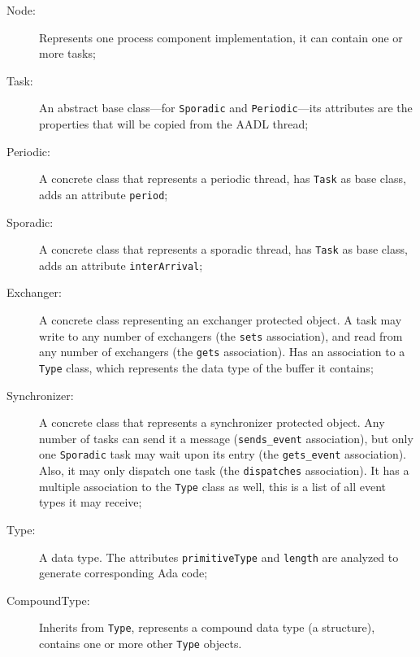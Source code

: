 \begin{description}
\item[Node:]{Represents one process component implementation, it can
  contain one or more tasks;}
\item[Task:]{An abstract base class---for \texttt{Sporadic} and
  \texttt{Periodic}---its attributes are the properties that will be
  copied from the AADL thread;}
\item[Periodic:]{A concrete class that represents a periodic thread,
  has \texttt{Task} as base class, adds an attribute \texttt{period};}
\item[Sporadic:]{A concrete class that represents a sporadic thread,
  has \texttt{Task} as base class, adds an attribute
  \texttt{interArrival};}
\item[Exchanger:]{A concrete class representing an exchanger protected
  object. A task may write to any number of exchangers (the
  \texttt{sets} association), and read from any number of exchangers
  (the \texttt{gets} association). Has an association to a
  \texttt{Type} class, which represents the data type of the buffer it
  contains;}
\item[Synchronizer:]{A concrete class that represents a synchronizer
  protected object. Any number of tasks can send it a message
  (\texttt{sends\_event} association), but only one \texttt{Sporadic}
  task may wait upon its entry (the \texttt{gets\_event}
  association). Also, it may only dispatch one task (the
  \texttt{dispatches} association). It has a multiple association to
  the \texttt{Type} class as well, this is a list of all event types
  it may receive;}
\item[Type:]{A data type. The attributes \texttt{primitiveType} and
  \texttt{length} are analyzed to generate corresponding Ada code;}
\item[CompoundType:]{Inherits from \texttt{Type}, represents a
  compound data type (a  structure), contains one or more
  other \texttt{Type} objects.}
\end{description}

